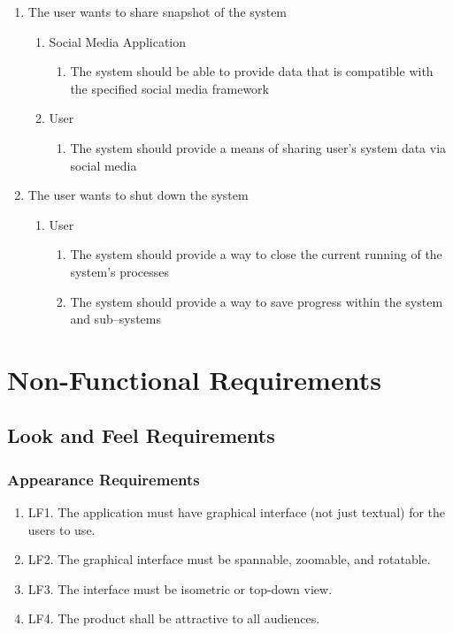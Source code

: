 \documentclass[]{article}
\begin{document}
\begin{enumerate}
\begin{enumerate}
\begin{enumerate}
			\end{enumerate}
	\end{enumerate}
	\item The user wants to share snapshot of the system
	\begin{enumerate}
		\item Social Media Application
			\begin{enumerate}
				\item The system should be able to provide data that is compatible with the specified social media framework
			\end{enumerate}
			\item User
			\begin{enumerate}
				\item The system should provide a means of sharing user’s system data via social media
			\end{enumerate}
	\end{enumerate}
	\item The user wants to shut down the system
	\begin{enumerate}
		\item User
			\begin{enumerate}
				\item The system should provide a way to close the current running of the system’s processes
				\item The system should provide a way to save progress within the system and sub--systems
			\end{enumerate}
	\end{enumerate}
\end{enumerate}

\section{Non-Functional Requirements}
\subsection{Look and Feel Requirements}
\subsubsection{Appearance Requirements}
\begin{enumerate}
\item LF1. The application must have graphical interface (not just textual) for the users to use.
\item LF2. The graphical interface must be spannable, zoomable, and rotatable.
\item LF3. The interface must be isometric or top-down view.
\item LF4. The product shall be attractive to all audiences. 
\end{enumerate}
\end{document}

